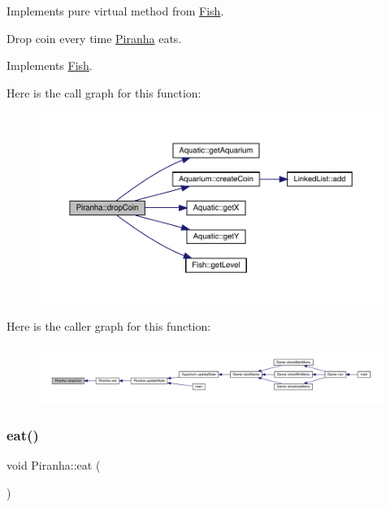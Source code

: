 Implements pure virtual method from \mbox{\hyperlink{class_fish}{Fish}}. 

Drop coin every time \mbox{\hyperlink{class_piranha}{Piranha}} eats. 

Implements \mbox{\hyperlink{class_fish_a899c7712639756297b9205e8bbcc2cf6}{Fish}}.

Here is the call graph for this function\+:\nopagebreak
\begin{figure}[H]
\begin{center}
\leavevmode
\includegraphics[width=350pt]{class_piranha_aee107987f36631002f04c5283564382b_cgraph}
\end{center}
\end{figure}
Here is the caller graph for this function\+:
\nopagebreak
\begin{figure}[H]
\begin{center}
\leavevmode
\includegraphics[width=350pt]{class_piranha_aee107987f36631002f04c5283564382b_icgraph}
\end{center}
\end{figure}
\mbox{\label{class_piranha_ac48c0256edd56c427b3d82f6e0d4df82}} 
\subsubsection{\texorpdfstring{eat()}{eat()}}
{\footnotesize\ttfamily void Piranha\+::eat (\begin{DoxyParamCaption}{ }\end{DoxyParamCaption})\hspace{0.3cm}{\ttfamily [virtual]}}



